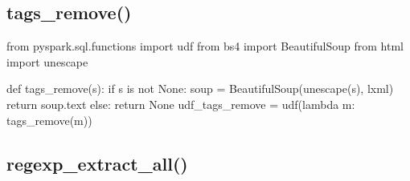 \documentclass[
  letterpaper,
  DIV=11,
  numbers=noendperiod]{scrreprt}
\newenvironment{Shaded}{\begin{snugshade}}{\end{snugshade}}
\newcommand{\ControlFlowTok}[1]{\textcolor[rgb]{0.00,0.23,0.31}{#1}}
\newcommand{\ImportTok}[1]{\textcolor[rgb]{0.00,0.46,0.62}{#1}}
\newcommand{\KeywordTok}[1]{\textcolor[rgb]{0.00,0.23,0.31}{#1}}
\newcommand{\NormalTok}[1]{\textcolor[rgb]{0.00,0.23,0.31}{#1}}
\newcommand{\OperatorTok}[1]{\textcolor[rgb]{0.37,0.37,0.37}{#1}}
\newcommand{\StringTok}[1]{\textcolor[rgb]{0.13,0.47,0.30}{#1}}
\newcommand{\VariableTok}[1]{\textcolor[rgb]{0.07,0.07,0.07}{#1}}
\begin{document}
\hypertarget{sec-tags-remove}{%
\subsection{tags\_remove()}\label{sec-tags-remove}}

\begin{Shaded}
\begin{Highlighting}[]
\ImportTok{from}\NormalTok{ pyspark.sql.functions }\ImportTok{import}\NormalTok{ udf}
\ImportTok{from}\NormalTok{ bs4 }\ImportTok{import}\NormalTok{ BeautifulSoup}
\ImportTok{from}\NormalTok{ html }\ImportTok{import}\NormalTok{ unescape}

\KeywordTok{def}\NormalTok{ tags\_remove(s):}
    \ControlFlowTok{if}\NormalTok{ s }\KeywordTok{is} \KeywordTok{not} \VariableTok{None}\NormalTok{:}
\NormalTok{        soup }\OperatorTok{=}\NormalTok{ BeautifulSoup(unescape(s), }\StringTok{\textquotesingle{}lxml\textquotesingle{}}\NormalTok{)}
        \ControlFlowTok{return}\NormalTok{ soup.text}
    \ControlFlowTok{else}\NormalTok{: }
        \ControlFlowTok{return} \VariableTok{None}
\NormalTok{udf\_tags\_remove }\OperatorTok{=}\NormalTok{ udf(}\KeywordTok{lambda}\NormalTok{ m: tags\_remove(m))}
\end{Highlighting}
\end{Shaded}

\hypertarget{regexp_extract_all}{%
\subsection{regexp\_extract\_all()}\label{regexp_extract_all}}
\end{document}
